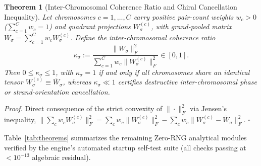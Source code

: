\documentclass[11pt,a4paper]{article}
\newtheorem{theorem}{Theorem}
\begin{document}
\begin{theorem}[Inter-Chromosomal Coherence Ratio and Chiral Cancellation Inequality]
\label{thm:coherence}
Let chromosomes $c=1,\dots,C$ carry positive pair-count weights $w_c>0$ ($\sum_{c=1}^C w_c = 1$) and quadrant projections $W_\sigma^{(c)}$, with grand-pooled matrix $\overline{W}_\sigma = \sum_{c=1}^C w_c W_\sigma^{(c)}$. Define the \emph{inter-chromosomal coherence ratio}
\begin{equation}
  \kappa_\sigma := \frac{\|\overline{W}_\sigma\|_F^2}{\sum_{c=1}^C w_c \|W_\sigma^{(c)}\|_F^2} \in [0, 1].
  \label{eq:coherence}
\end{equation}
Then $0 \le \kappa_\sigma \le 1$, with $\kappa_\sigma = 1$ if and only if all chromosomes share an identical tensor $W_\sigma^{(c)} \equiv \overline{W}_\sigma$, whereas $\kappa_\sigma \ll 1$ certifies destructive inter-chromosomal phase or strand-orientation cancellation.
\end{theorem}
\noindent\textit{Proof.} Direct consequence of the strict convexity of $\|\cdot\|_F^2$ via Jensen's inequality, $\|\sum_c w_c W_\sigma^{(c)}\|_F^2 = \sum_c w_c \|W_\sigma^{(c)}\|_F^2 - \sum_c w_c \|W_\sigma^{(c)} - \overline{W}_\sigma\|_F^2$. $\square$

Table~\ref{tab:theorems} summarizes the remaining Zero-RNG analytical modules verified by the engine's automated startup self-test suite (all checks passing at $<10^{-13}$ algebraic residual).
\end{document}
